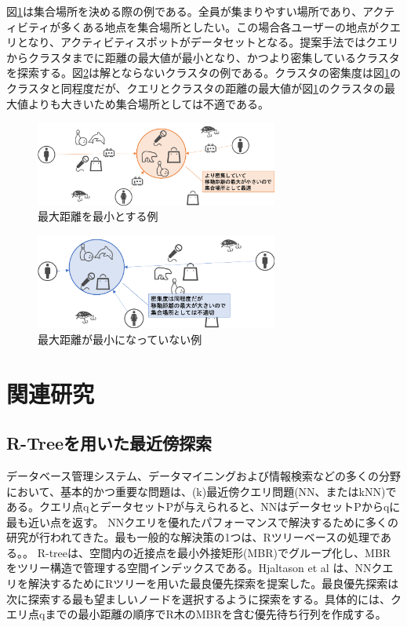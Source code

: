 \documentclass{deimj}
\theoremstyle{definition}
\begin{document}
図\ref{fig:ex-max1}は集合場所を決める際の例である。全員が集まりやすい場所であり、アクティビティが多くある地点を集合場所としたい。この場合各ユーザーの地点がクエリとなり、アクティビティスポットがデータセットとなる。提案手法ではクエリからクラスタまでに距離の最大値が最小となり、かつより密集しているクラスタを探索する。図\ref{fig:ex-max2}は解とならないクラスタの例である。クラスタの密集度は図\ref{fig:ex-max1}のクラスタと同程度だが、クエリとクラスタの距離の最大値が図\ref{fig:ex-max1}のクラスタの最大値よりも大きいため集合場所としては不適である。

\begin{figure}[H]
	\centering
    \includegraphics[width=8cm]{images/ex-max1.png}
    \caption{最大距離を最小とする例}
    \label{fig:ex-max1}
\end{figure}


\begin{figure}[H]
	\centering
    \includegraphics[width=8cm]{images/ex-max2.png}
    \caption{最大距離が最小になっていない例}
    \label{fig:ex-max2}
\end{figure}

\section{関連研究}

\subsection{R-Treeを用いた最近傍探索}
データベース管理システム、データマイニングおよび情報検索などの多くの分野において、基本的かつ重要な問題は、(k)最近傍クエリ問題(NN、またはkNN)である。クエリ点qとデータセットPが与えられると、NNはデータセットPからqに最も近い点を返す。 NNクエリを優れたパフォーマンスで解決するために多くの研究が行われてきた。最も一般的な解決策の1つは、Rツリーベースの処理である。\cite{cheung1998enhanced}\cite{hjaltason1999distance}。 R-tree\cite{R-tree}は、空間内の近接点を最小外接矩形(MBR)でグループ化し、MBRをツリー構造で管理する空間インデックスである。Hjaltason et al \cite{hjaltason1999distance}は、NNクエリを解決するためにRツリーを用いた最良優先探索を提案した。最良優先探索は次に探索する最も望ましいノードを選択するように探索をする。具体的には、クエリ点qまでの最小距離の順序でR木のMBRを含む優先待ち行列を作成する。
\end{document}
